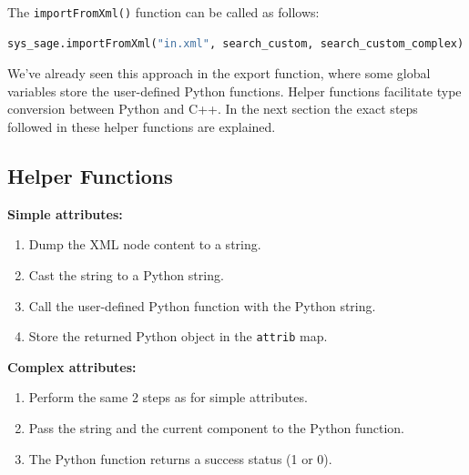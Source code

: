 The \verb|importFromXml()| function can be called as follows:

\begin{lstlisting}[language=Python, xleftmargin=4em, frame = single]
sys_sage.importFromXml("in.xml", search_custom, search_custom_complex)
\end{lstlisting}



We've already seen this approach in the export function,  where some global variables store the user-defined Python functions. Helper functions facilitate type conversion between Python and C++. In the next section the exact steps followed in these helper functions are explained.

\subsection{Helper Functions}
\textbf{Simple attributes:}
    \begin{enumerate}
        \item Dump the XML node content to a string.
        \item Cast the string to a Python string.
        \item Call the user-defined Python function with the Python string.
        \item Store the returned Python object in the \verb|attrib| map.
    \end{enumerate}
    \textbf{Complex attributes:}
    \begin{enumerate}
        \item Perform the same 2 steps as for simple attributes.
        \item Pass the string and the current component to the Python function.
        \item The Python function returns a success status (1 or 0).
    \end{enumerate}


